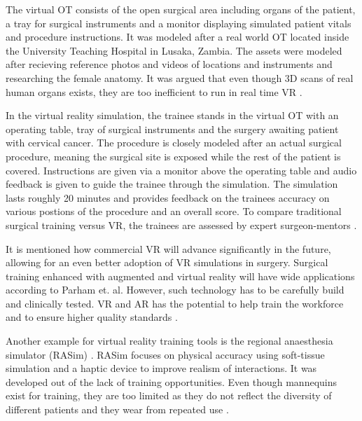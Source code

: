 The virtual OT consists of the open surgical area including organs of the patient, a tray for surgical instruments and a monitor displaying simulated patient vitals and procedure instructions.
It was modeled after a real world OT located inside the University Teaching Hospital in Lusaka, Zambia.
The assets were modeled after recieving reference photos and videos of locations and instruments and researching the female anatomy.
It was argued that even though 3D scans of real human organs exists, they are too inefficient to run in real time VR \cite{RN52}.

In the virtual reality simulation, the trainee stands in the virtual OT with an operating table, tray of surgical instruments and the surgery awaiting patient with cervical cancer.
The procedure is closely modeled after an actual surgical procedure, meaning the surgical site is exposed while the rest of the patient is covered.
Instructions are given via a monitor above the operating table and audio feedback is given to guide the trainee through the simulation.
The simulation lasts roughly 20 minutes and provides feedback on the trainees accuracy on various postions of the procedure and an overall score.
To compare traditional surgical training versus VR, the trainees are assessed by expert surgeon-mentors \cite{RN52}.

It is mentioned how commercial VR will advance significantly in the future, allowing for an even better adoption of VR simulations in surgery.
Surgical training enhanced with augmented and virtual reality will have wide applications according to Parham et. al.
However, such technology has to be carefully build and clinically tested.
VR and AR has the potential to help train the workforce and to ensure higher quality standards \cite{RN52}.

Another example for virtual reality training tools is the regional anaesthesia simulator (RASim) \cite{RN70}.
RASim focuses on physical accuracy using soft-tissue simulation and a haptic device to improve realism of interactions.
It was developed out of the lack of training opportunities. Even though mannequins exist for training, they are too limited 
as they do not reflect the diversity of different patients and they wear from repeated use \cite{RN70}.

